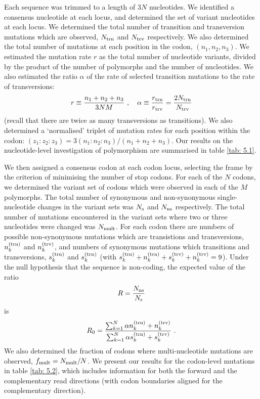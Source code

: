 \documentclass[unnumsec,webpdf,contemporary,large,namedate]{oup-authoring-template}%
\theoremstyle{thmstyleone}%
\theoremstyle{thmstyletwo}%
\theoremstyle{thmstylethree}%
\begin{document}
Each sequence was trimmed to a length of $3N$ nucleotides. We identified a consensus 
nucleotide at each locus, and determined the set of variant nucleotides at each locus. 
We determined the total number of transition and transversion mutations which are observed, 
$N_{\rm trn}$ and $N_{\rm trv}$ respectively. We also determined the total number 
of mutations at each position in the codon, $(n_1,n_2,n_3)$. 
We estimated the mutation rate $r$ as the total number of nucleotide variants, 
divided by the product of the number of polymorphs and the number of nucleotides. We also
estimated the ratio $\alpha$ of the rate of selected transition mutations to the rate of transversions:
%
\begin{equation}
\label{eq: 5.1}
r\equiv \frac{n_1+n_2+n_3}{3NM}
\ ,\ \ \ 
\alpha\equiv \frac{r_{\rm trn}}{r_{\rm trv}}=\frac{2N_{\rm trn}}{N_{\rm trv}}
\end{equation}
%
(recall that there are twice as many transversions as transitions). We also determined a \lq normalised' 
triplet of mutation rates for each position within the codon: $(z_1:z_2:z_3)=3(n_1:n_2:n_3)/(n_1+n_2+n_3)$. 
Our results on the nucleotide-level 
investigation of polymorphism are summarised in table \ref{tab: 5.1}. 

We then assigned a consensus codon at each codon locus, selecting the 
frame by the criterion of minimising the number of stop codons. 
For each of the $N$ codons, we determined the variant set of codons
which were observed in each of the $M$ polymorphs. The total 
number of synonymous and non-synonymous single-nucleotide changes in the variant sets 
was $N_{\rm s}$ and $N_{\rm ns}$ respectively. The total number of mutations 
encountered in the variant sets where two or three nucleotides were changed was $N_{\rm mult}$.
For each codon there are 
numbers of possible non-synonymous mutations which are transistions and transversions, 
$n_k^{({\rm trn})}$ and $n_k^{({\rm trv})}$, and numbers of synonymous mutations 
which transitions and transversions, $s_k^{({\rm trn})}$ and $s_k^{({\rm trn})}$
(with $s_k^{({\rm trn})}+n_k^{({\rm trn})}+s_k^{({\rm trv})}+n_k^{({\rm trv})}=9$). Under the null 
hypothesis that the sequence is non-coding, the expected value of the ratio 
%
\begin{equation}
\label{eq: 5.2}
R=\frac{N_{\rm ns}}{N_{\rm s}}
\end{equation}
%
is 
%
\begin{equation}
\label{eq: 5.3}
R_0=\frac{\sum_{k=1}^N\alpha n_k^{({\rm trn})}+n_k^{({\rm trv})}}
{\sum_{k=1}^N\alpha s_k^{({\rm trn})}+s_k^{({\rm trv})}}
\ .
\end{equation}
%
We also determined the fraction of codons where multi-nucleotide mutations are observed, 
$f_{\rm mult}=N_{\rm mult}/N$.
We present our results for the codon-level mutations in table \ref{tab: 5.2}, which includes information 
for both the forward and the complementary read directions (with codon boundaries aligned 
for the complementary direction).
\end{document}
